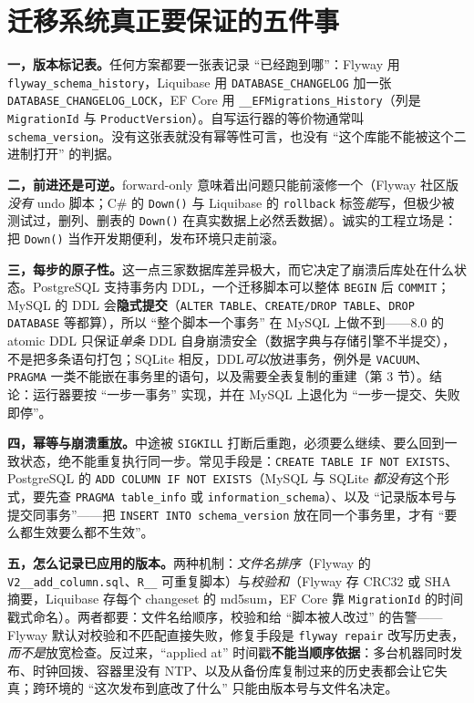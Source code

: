 \documentclass[12pt,a4paper,fontset=fandol]{ctexbook}
\newcommand{\Fn}[1]{\texttt{#1()}}
\newcommand{\Tp}[1]{\texttt{#1}}
\newcommand{\CSharp}{C\#}
\begin{document}
\section{迁移系统真正要保证的五件事}

\textbf{一，版本标记表。}任何方案都要一张表记录 ``已经跑到哪''：Flyway 用 \Tp{flyway\_\allowbreak schema\_\allowbreak history}，Liquibase 用 \Tp{DATABASE\_\allowbreak CHANGELOG} 加一张 \Tp{DATABASE\_\allowbreak CHANGELOG\_\allowbreak LOCK}，EF Core 用 \Tp{\_\_EFMigrations\_\allowbreak History}（列是 \Tp{MigrationId} 与 \Tp{ProductVersion}）。自写运行器的等价物通常叫 \Tp{schema\_version}。没有这张表就没有幂等性可言，也没有 ``这个库能不能被这个二进制打开'' 的判据。

\textbf{二，前进还是可逆。}forward-only 意味着出问题只能前滚修一个（Flyway 社区版\emph{没有} undo 脚本；\CSharp{} 的 \Fn{Down} 与 Liquibase 的 \texttt{rollback} 标签\emph{能}写，但极少被测试过，删列、删表的 \Fn{Down} 在真实数据上必然丢数据）。诚实的工程立场是：把 \Fn{Down} 当作开发期便利，发布环境只走前滚。

\textbf{三，每步的原子性。}这一点三家数据库差异极大，而它决定了崩溃后库处在什么状态。PostgreSQL 支持事务内 DDL，一个迁移脚本可以整体 \texttt{BEGIN} 后 \texttt{COMMIT}；MySQL 的 DDL 会\textbf{隐式提交}（\texttt{ALTER TABLE}、\texttt{CREATE/DROP TABLE}、\texttt{DROP DATABASE} 等都算），所以 ``整个脚本一个事务'' 在 MySQL 上做不到——8.0 的 atomic DDL 只保证\emph{单条} DDL 自身崩溃安全（数据字典与存储引擎不半提交），不是把多条语句打包；SQLite 相反，DDL\emph{可以}放进事务，例外是 \texttt{VACUUM}、\texttt{PRAGMA} 一类不能嵌在事务里的语句，以及需要全表复制的重建（第 3 节）。结论：运行器要按 ``一步一事务'' 实现，并在 MySQL 上退化为 ``一步一提交、失败即停''。

\textbf{四，幂等与崩溃重放。}中途被 \Tp{SIGKILL} 打断后重跑，必须要么继续、要么回到一致状态，绝不能重复执行同一步。常见手段是：\texttt{CREATE TABLE IF NOT EXISTS}、PostgreSQL 的 \texttt{ADD COLUMN IF NOT EXISTS}（MySQL 与 SQLite \emph{都没有}这个形式，要先查 \Tp{PRAGMA table\_info} 或 \Tp{information\_schema}）、以及 ``记录版本号与提交同事务''——把 \texttt{INSERT INTO schema\_version} 放在同一个事务里，才有 ``要么都生效要么都不生效''。

\textbf{五，怎么记录已应用的版本。}两种机制：\emph{文件名排序}（Flyway 的 \Tp{V2\_\_add\_\allowbreak column.sql}、\texttt{R\_\_} 可重复脚本）与\emph{校验和}（Flyway 存 CRC32 或 SHA 摘要，Liquibase 存每个 changeset 的 md5sum，EF Core 靠 \Tp{MigrationId} 的时间戳式命名）。两者都要：文件名给顺序，校验和给 ``脚本被人改过'' 的告警——Flyway 默认对校验和不匹配直接失败，修复手段是 \texttt{flyway repair} 改写历史表，\emph{而不是}放宽检查。反过来，``applied at'' 时间戳\textbf{不能当顺序依据}：多台机器同时发布、时钟回拨、容器里没有 NTP、以及从备份库复制过来的历史表都会让它失真；跨环境的 ``这次发布到底改了什么'' 只能由版本号与文件名决定。
\end{document}
